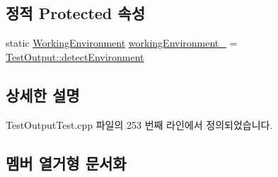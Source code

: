 \subsection*{정적 Protected 속성}
\begin{DoxyCompactItemize}
\item 
static \hyperlink{class_test_output_a0541851f863713454486a9fb3080f766}{Working\+Environment} \hyperlink{class_test_output_a8b622cfce4b95599cd31b61a777d68ef}{working\+Environment\+\_\+} = \hyperlink{class_test_output_a0541851f863713454486a9fb3080f766a3f11f791db94db142e33c3c75442ed10}{Test\+Output\+::detect\+Environment}
\end{DoxyCompactItemize}


\subsection{상세한 설명}


Test\+Output\+Test.\+cpp 파일의 253 번째 라인에서 정의되었습니다.



\subsection{멤버 열거형 문서화}
